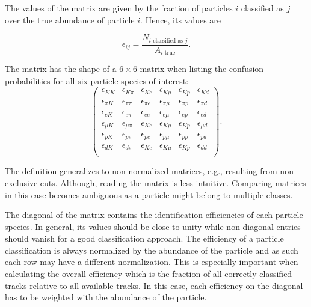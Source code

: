 The values of the matrix are given by the fraction of particles $i$ classified as $j$ over the true abundance of particle $i$. Hence, its values are

\begin{equation}
	\epsilon_{i j} = \frac{N_{i \text{ classified as } j}}{A_{i \text{ true}}}.
\end{equation}

The matrix has the shape of a $6 \times 6$ matrix when listing the confusion probabilities for all six particle species of interest:
\begin{equation}
	\begin{pmatrix}
		\epsilon_{K K} & \epsilon_{K \pi} & \epsilon_{K e} & \epsilon_{K \mu} & \epsilon_{K p} & \epsilon_{K d} \\
		\epsilon_{\pi K} & \epsilon_{\pi \pi} & \epsilon_{\pi e} & \epsilon_{\pi \mu} & \epsilon_{\pi p} & \epsilon_{\pi d} \\
		\epsilon_{e K} & \epsilon_{e \pi} & \epsilon_{e e} & \epsilon_{e \mu} & \epsilon_{e p} & \epsilon_{e d} \\
		\epsilon_{\mu K} & \epsilon_{\mu \pi} & \epsilon_{K e} & \epsilon_{K \mu} & \epsilon_{K p} & \epsilon_{\mu d} \\
		\epsilon_{p K} & \epsilon_{p \pi} & \epsilon_{p e} & \epsilon_{p \mu} & \epsilon_{p p} & \epsilon_{p d} \\
		\epsilon_{d K} & \epsilon_{d \pi} & \epsilon_{K e} & \epsilon_{K \mu} & \epsilon_{K p} & \epsilon_{d d} \\
	\end{pmatrix}.
\end{equation}

The definition generalizes to non-normalized matrices, e.g., resulting from non-exclusive cuts. Although, reading the matrix is less intuitive. Comparing matrices in this case becomes ambiguous as a particle might belong to multiple classes.

The diagonal of the matrix contains the identification efficiencies of each particle species. In general, its values should be close to unity while non-diagonal entries should vanish for a good classification approach. The efficiency of a particle classification is always normalized by the abundance of the particle and as such each row may have a different normalization. This is especially important when calculating the overall efficiency which is the fraction of all correctly classified tracks relative to all available tracks. In this case, each efficiency on the diagonal has to be weighted with the abundance of the particle.

